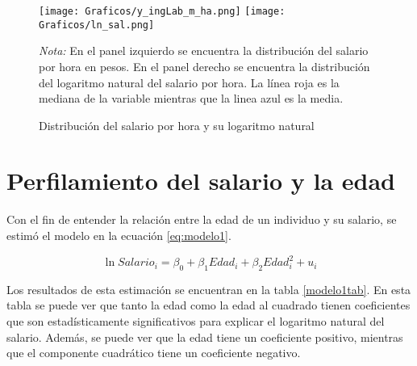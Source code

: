 \documentclass[article,11 pt]{article}
\begin{document}
\begin{figure}[h]
    \centering
    \caption{Distribución del salario por hora y su logaritmo natural}
    \texttt{[image: Graficos/y\_ingLab\_m\_ha.png]}
    \texttt{[image: Graficos/ln\_sal.png]}
    
    \label{fig:salarios}
    \par{\footnotesize{\textit{Nota:} En el panel izquierdo se encuentra la distribución del salario por hora en pesos. En el panel derecho se encuentra la distribución del logaritmo natural del salario por hora. La línea roja es la mediana de la variable mientras que la linea azul es la media.}}
\end{figure}
\newpage
\section{Perfilamiento del salario y la edad}

Con el fin de entender la relación entre la edad de un individuo y su salario, se estimó el modelo en la ecuación \ref{eq:modelo1}. 

\begin{equation}
    \ln{Salario_i} = \beta_0 + \beta_1 Edad_i + \beta_2 Edad^2_i + u_i
    \label{eq:modelo1}
\end{equation}

Los resultados de esta estimación se encuentran en la tabla \ref{modelo1tab}. En esta tabla se puede ver que tanto la edad como la edad al cuadrado tienen coeficientes que son estadísticamente significativos para explicar el logaritmo natural del salario. Además, se puede ver que la edad tiene un coeficiente positivo, mientras que el componente cuadrático tiene un coeficiente negativo.
\end{document}
